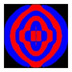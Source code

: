 \begin{figure}[p]
\begin{subfigure}[b]{0.3\textwidth}
    \end{subfigure}
    ~
    \begin{subfigure}[b]{0.3\textwidth}
        \includegraphics[width=\textwidth]{include/graphics/pml-on-2}
    \end{subfigure}
    

\end{figure}
